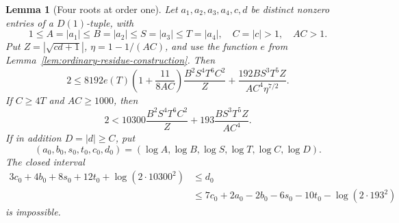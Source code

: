 \documentclass[12pt]{article}
\newtheorem{lemma}[theorem]{Lemma}
\numberwithin{equation}{section}
\begin{document}
\begin{lemma}[Four roots at order one]\label{sm:lem-four-root-k1}
Let \(a_1,a_2,a_3,a_4,c,d\) be distinct nonzero entries of a
\(D(1)\)-tuple, with
\[
 1\le A=|a_1|\le B=|a_2|\le S=|a_3|\le T=|a_4|,
 \quad C=|c|>1,\quad AC>1.
\]
Put \(Z=|\sqrt{cd+1}|\), \(\eta=1-1/(AC)\), and use the function
\(e\) from Lemma~\ref{lem:ordinary-residue-construction}. Then
\begin{equation}
 2\le8192e(T)\left(1+\frac{11}{8AC}\right)
       \frac{B^2S^4T^6C^2}{Z}
       +\frac{192BS^3T^5Z}{AC^4\eta^{7/2}}.
 \label{sm:eq-four-root-exact}
\end{equation}
If \(C\ge4T\) and \(AC\ge1000\), then
\begin{equation}
 2<10300\frac{B^2S^4T^6C^2}{Z}
       +193\frac{BS^3T^5Z}{AC^4}.
 \label{sm:eq-four-root-safe}
\end{equation}
If in addition \(D=|d|\ge C\), put
\[
 (a_0,b_0,s_0,t_0,c_0,d_0)=(\log A,\log B,\log S,\log T,\log C,\log D).
\]
The closed interval
\begin{align}
 3c_0+4b_0+8s_0+12t_0+\log(2\cdot10300^2)
 &\le d_0\nonumber\\
 &\le7c_0+2a_0-2b_0-6s_0-10t_0-\log(2\cdot193^2)
 \label{sm:eq-four-root-window}
\end{align}
is impossible.
\end{lemma}
\end{document}

